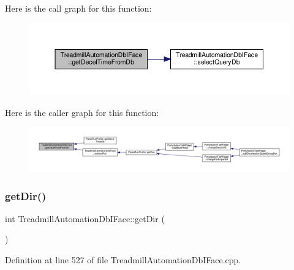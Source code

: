 Here is the call graph for this function\+:
\nopagebreak
\begin{figure}[H]
\begin{center}
\leavevmode
\includegraphics[width=350pt]{class_treadmill_automation_db_i_face_ab0f40648321f15da9cad739db19dd6fa_cgraph}
\end{center}
\end{figure}
Here is the caller graph for this function\+:
\nopagebreak
\begin{figure}[H]
\begin{center}
\leavevmode
\includegraphics[width=350pt]{class_treadmill_automation_db_i_face_ab0f40648321f15da9cad739db19dd6fa_icgraph}
\end{center}
\end{figure}
\mbox{\label{class_treadmill_automation_db_i_face_a62cebf1a91434417a4bab0fc8eb7f27e}} 
\subsubsection{\texorpdfstring{get\+Dir()}{getDir()}}
{\footnotesize\ttfamily int Treadmill\+Automation\+Db\+I\+Face\+::get\+Dir (\begin{DoxyParamCaption}{ }\end{DoxyParamCaption})}



Definition at line 527 of file Treadmill\+Automation\+Db\+I\+Face.\+cpp.

\mbox{\label{class_treadmill_automation_db_i_face_a21cf6860ec06b988509d671c21693342}} 

